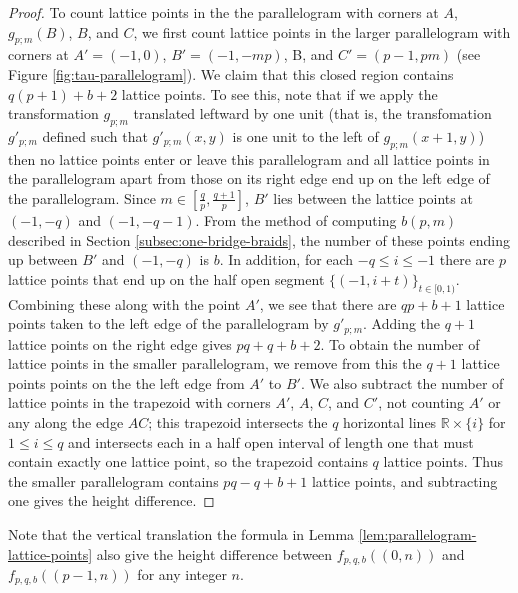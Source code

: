 \documentclass{amsart}
\newcommand{\R}{\mathbb{R}}
\theoremstyle{definition}
\theoremstyle{remark}
\numberwithin{equation}{section}
\numberwithin{equation}{section} \makeatletter
\begin{document}
\begin{proof}
To count lattice points in the the parallelogram with corners at $A$, $g_{p;m}(B)$, $B$, and $C$, we first count lattice points in the larger parallelogram with corners at $A' = (-1, 0)$, $B' = (-1, -mp)$, B, and $C' = (p-1, pm)$ (see Figure \ref{fig:tau-parallelogram}). We claim that this closed region contains $q(p+1) + b + 2$ lattice points. To see this, note that if we apply the transformation $g_{p;m}$ translated leftward by one unit (that is, the transfomation $g'_{p;m}$ defined such that $g'_{p;m}(x,y)$ is one unit to the left of $g_{p;m}(x+1,y)$) then no lattice points enter or leave this parallelogram and all lattice points in the parallelogram apart from those on its right edge end up on the left edge of the parallelogram. Since $m \in [\frac q p, \frac{q+1}{p}]$, $B'$ lies between the lattice points at $(-1, -q)$ and $(-1, -q-1)$. From the method of computing $b(p,m)$ described in Section \ref{subsec:one-bridge-braids}, the number of these points ending up between $B'$ and $(-1, -q)$ is $b$. In addition, for each $-q \le i \le -1$ there are $p$ lattice points that end up on the half open segment $\{(-1, i+t)\}_{t\in[0,1)}$. Combining these along with the point $A'$, we see that there are $qp + b + 1$ lattice points taken to the left edge of the parallelogram by $g'_{p;m}$. Adding the $q+1$ lattice points on the right edge gives $pq + q + b +2$. To obtain the number of lattice points in the smaller parallelogram, we remove from this the $q+1$ lattice points points on the the left edge from $A'$ to $B'$. We also subtract the number of lattice points in the trapezoid with corners $A'$, $A$, $C$, and $C'$, not counting $A'$ or any along the edge $AC$; this trapezoid intersects the $q$ horizontal lines $\R\times\{i\}$ for $1\le i \le q$ and intersects each in a half open interval of length one that must contain exactly one lattice point, so the trapezoid contains $q$ lattice points. Thus the smaller parallelogram contains $pq - q + b + 1$ lattice points, and subtracting one gives the height difference.
\end{proof}
Note that the vertical translation the formula in Lemma \ref{lem:parallelogram-lattice-points} also give the height difference between $f_{p,q,b}( (0, n) )$ and $f_{p,q,b}( (p-1, n) )$ for any integer $n$.
\end{document}
